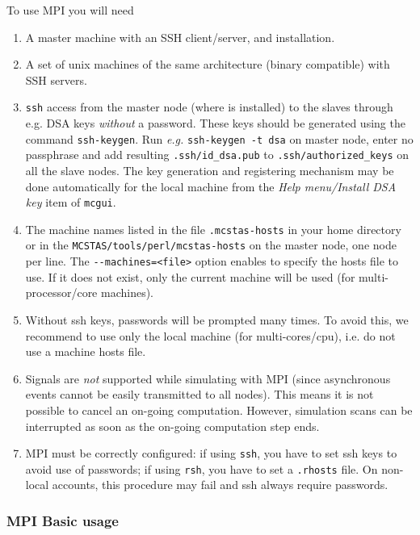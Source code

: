 To use MPI you will need
  \begin{enumerate}
  \item{A master machine with an SSH client/server, and \MCS installation.}
  \item{A set of unix machines of the same architecture (binary compatible) with
      SSH servers.}
  \item{ \texttt{ssh} access from the master node (where \MCS is
      installed) to the slaves through e.g. DSA keys \emph{without} a
      password. These keys should be generated using the command
      \texttt{ssh-keygen}. Run \emph{e.g.} \texttt{ssh-keygen -t dsa} on
      master node, enter no passphrase and add resulting
      \texttt{.ssh/id\_dsa.pub} to \texttt{.ssh/authorized\_keys}
      on all the slave nodes. The key generation and registering mechanism
      may be done automatically for the local machine from the
      \emph{Help menu/Install DSA key} item of \verb+mcgui+.}
  \item{The machine names listed in the file \texttt{.mcstas-hosts} in
      your home directory or in the \texttt{MCSTAS/tools/perl/mcstas-hosts} on
      the master node, one node per line. The \verb'--machines=<file>' option
      enables to specify the hosts file to use. If it does not exist, only
      the current machine will be used (for multi-processor/core machines).}
  \item{Without ssh keys, passwords will be prompted many times. To avoid this,
      we recommend to use only the local machine (for multi-cores/cpu), i.e. do
      not use a machine hosts file.}
  \item Signals are \emph{not} supported while simulating with MPI (since
    asynchronous events cannot be easily transmitted to all nodes). This
    means it is not possible to cancel an on-going computation. However,
    simulation scans can be interrupted as soon as the on-going computation
    step ends.
  \item MPI must be correctly configured: if using \verb'ssh', you
    have to set ssh keys to avoid use of passwords; if
    using \verb'rsh', you have to set a \verb'.rhosts' file.
    On non-local accounts, this procedure may fail and ssh always require passwords.
  \end{enumerate}

\subsubsection{MPI Basic usage}


